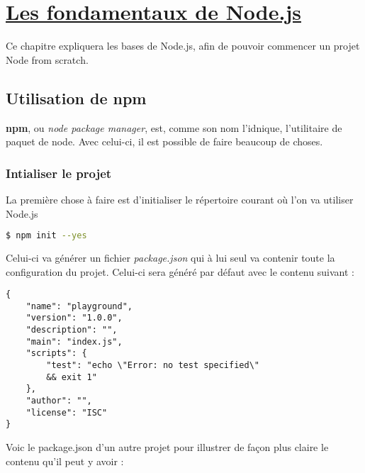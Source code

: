 \documentclass[a4paper,10pt]{article}
\begin{document}
\section{\underline{Les fondamentaux de Node.js}}
Ce chapitre expliquera les bases de Node.js, afin de pouvoir commencer un projet Node from scratch.
\subsection{Utilisation de npm}
\textbf{npm}, ou \emph{node package manager}, est, comme son nom l'idnique, l'utilitaire de paquet de node. Avec celui-ci, il est possible de faire beaucoup de choses.


\subsubsection{Intialiser le projet}
La première chose à faire est d'initialiser le répertoire courant où l'on va utiliser Node.js
\begin{lstlisting}[language=bash, frame=single]
    $ npm init --yes
\end{lstlisting}
Celui-ci va générer un fichier \emph{package.json} qui à lui seul va contenir toute la configuration du projet. Celui-ci sera généré par défaut avec le contenu suivant :
\begin{lstlisting}[frame=single, caption={package.json}, captionpos=b]
{
    "name": "playground",
    "version": "1.0.0",
    "description": "",
    "main": "index.js",
    "scripts": {
        "test": "echo \"Error: no test specified\" 
        && exit 1"
    },
    "author": "",
    "license": "ISC"
}
\end{lstlisting}

Voic le package.json d'un autre projet pour illustrer de façon plus claire le contenu qu'il peut y avoir :
\end{document}
